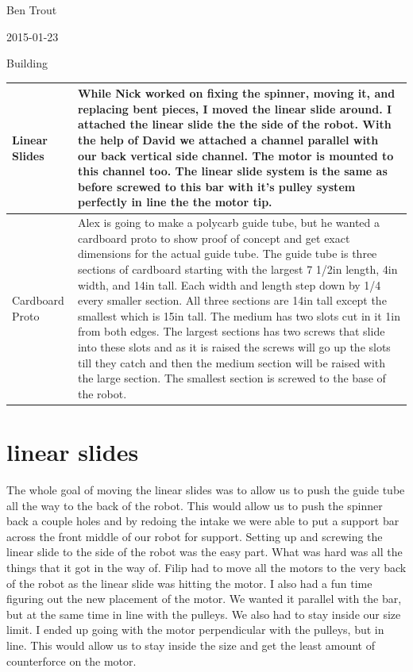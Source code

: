 Ben Trout

2015-01-23

Building

\begin{tabular}{|p{5cm}|p{5cm}|}
\hline
Linear Slides&
While Nick worked on fixing the spinner, moving it, and replacing bent pieces, I moved the linear slide around. I attached the linear slide the the side of the robot. With the help of David we attached a channel parallel with our back vertical side channel. The motor is mounted to this channel too. The linear slide system is the same as before screwed to this bar with it’s pulley system perfectly in line the the motor tip.
\\
\hline
Cardboard Proto&
Alex is going to make a polycarb guide tube, but he wanted a cardboard proto to show proof of concept and get exact dimensions for the actual guide tube. The guide tube is three sections of cardboard starting with the largest 7 1/2in length, 4in width, and 14in tall. Each width and length step down by 1/4 every smaller section. All three sections are 14in tall except the smallest which is 15in tall. The medium has two slots cut in it 1in from both edges. The largest sections has two screws that slide into these slots and as it is raised the screws will go up the slots till they catch and then the medium section will be raised with the large section. The smallest section is screwed to the base of the robot. 
\\
\hline
\end{tabular}

\section*{linear slides}
The whole goal of moving the linear slides was to allow us to push the guide tube all the way to the back of the robot. This would allow us to push the spinner back a couple holes and by redoing the intake we were able to put a support bar across the front middle of our robot for support. Setting up and screwing the linear slide to the side of the robot was the easy part. What was hard was all the things that it got in the way of. Filip had to move all the motors to the very back of the robot as the linear slide was hitting the motor. I also had a fun time figuring out the new placement of the motor. We wanted it parallel with the bar, but at the same time in line with the pulleys. We also had to stay inside our size limit. I ended up going with the motor perpendicular with the pulleys, but in line. This would allow us to stay inside the size and get the least amount of counterforce on the motor. 

